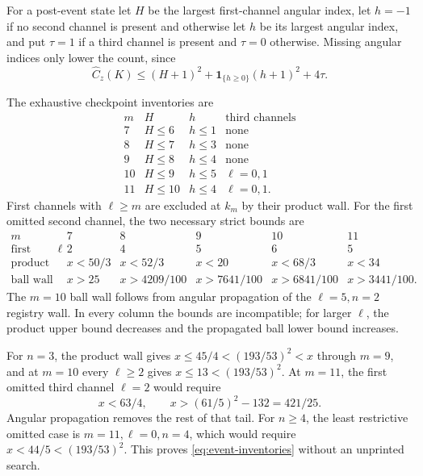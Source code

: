 \documentclass[11pt]{article}
\begin{document}
For a post-event state let \(H\) be the largest first-channel angular index,
let \(h=-1\) if no second channel is present and otherwise let \(h\) be its
largest angular index, and put \(\tau=1\) if a third channel is present and
\(\tau=0\) otherwise.  Missing angular indices only lower the count, since
\begin{equation}
 \widehat C_z(K)
 \leq (H+1)^2+\mathbf1_{\{h\geq0\}}(h+1)^2+4\tau.
 \label{eq:block-post-cap}
\end{equation}

The exhaustive checkpoint inventories are
\begin{equation}
\begin{array}{c|c|c|c}
m&H&h&\text{third channels}\\ \hline
7&H\leq6&h\leq1&\text{none}\\
8&H\leq7&h\leq3&\text{none}\\
9&H\leq8&h\leq4&\text{none}\\
10&H\leq9&h\leq5&\ell=0,1\\
11&H\leq10&h\leq4&\ell=0,1.
\end{array}
\label{eq:event-inventories}
\end{equation}
First channels with \(\ell\geq m\) are excluded at \(k_m\) by their product
wall.  For the first omitted second channel, the two necessary strict bounds
are
\[
\begin{array}{c|ccccc}
m&7&8&9&10&11\\ \hline
\text{first omitted }\ell&2&4&5&6&5\\
\text{product wall}&x<50/3&x<52/3&x<20&x<68/3&x<34\\
\text{ball wall}&x>25&x>4209/100&x>7641/100&
x>6841/100&x>3441/100.
\end{array}
\]
The \(m=10\) ball wall follows from angular propagation of the
\(\ell=5,n=2\) registry wall.  In every column the bounds are incompatible;
for larger \(\ell\), the product upper bound decreases and the propagated
ball lower bound increases.

For \(n=3\), the product wall gives
\(x\leq45/4<(193/53)^2<x\) through \(m=9\), and at \(m=10\) every
\(\ell\geq2\) gives \(x\leq13<(193/53)^2\).  At \(m=11\), the first
omitted third channel \(\ell=2\) would require
\[
 x<63/4,\qquad x>(61/5)^2-132=421/25.
\]
Angular propagation removes the rest of that tail.  For \(n\geq4\), the
least restrictive omitted case is \(m=11,\ell=0,n=4\), which would require
\(x<44/5<(193/53)^2\).  This proves
\eqref{eq:event-inventories} without an unprinted search.
\end{document}

